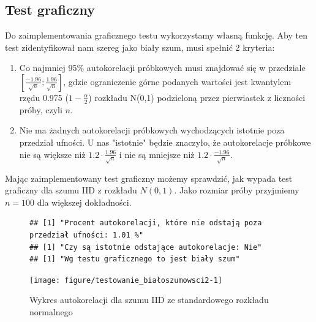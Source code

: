 \documentclass[10pt, a4paper]{article}\usepackage[]{graphicx}\usepackage[]{xcolor}
\makeatletter
\newenvironment{kframe}{%
 \def\at@end@of@kframe{}%
 \ifinner\ifhmode%
  \def\at@end@of@kframe{\end{minipage}}%
  \begin{minipage}{\columnwidth}%
 \fi\fi%
 \def\FrameCommand##1{\hskip\@totalleftmargin \hskip-\fboxsep
 \colorbox{shadecolor}{##1}\hskip-\fboxsep
     \hskip-\linewidth \hskip-\@totalleftmargin \hskip\columnwidth}%
 \MakeFramed {\advance\hsize-\width
   \@totalleftmargin\z@ \linewidth\hsize
   \@setminipage}}%
 {\par\unskip\endMakeFramed%
 \at@end@of@kframe}
\newenvironment{knitrout}{}{} %
\makeatother
\begin{document}
\subsection{Test graficzny} \label{sekcja1}
Do zaimplementowania graficznego testu wykorzystamy własną funkcję. Aby ten test zidentyfikował nam szereg jako biały szum, musi spełnić 2 kryteria:
\begin{enumerate}
\item Co najmniej 95\% autokorelacji próbkowych musi znajdować się w przedziale $[\frac{-1.96}{\sqrt{n}}; \frac{1.96}{\sqrt{n}}]$, gdzie ograniczenie górne podanych wartości jest kwantylem rzędu 0.975 ($1-\frac{\alpha}{2}$) rozkładu N(0,1) podzieloną przez pierwiastek z liczności próby, czyli $n$.
\item Nie ma żadnych autokorelacji próbkowych wychodzących istotnie poza przedział ufności. U nas "istotnie" będzie znaczyło, że autokorelacje próbkowe nie są większe niż $1.2\cdot\frac{1.96}{\sqrt{n}}$ i nie są mniejsze niż $1.2\cdot\frac{-1.96}{\sqrt{n}}$.
\end{enumerate}

Mając zaimplementowany test graficzny możemy sprawdzić, jak wypada test graficzny dla szumu IID z rozkładu $N(0,1)$. Jako rozmiar próby przyjmiemy $n=100$ dla większej dokładności.
\begin{figure}[H]
\begin{knitrout}
\color{fgcolor}\begin{kframe}
\begin{verbatim}
## [1] "Procent autokorelacji, które nie odstają poza przedział ufności: 1.01 %"
## [1] "Czy są istotnie odstające autokorelacje: Nie"
## [1] "Wg testu graficznego to jest biały szum"
\end{verbatim}
\end{kframe}

{\centering \texttt{[image: figure/testowanie\_białoszumowsci2-1]} 

}


\end{knitrout}
\caption{Wykres autokorelacji dla szumu IID ze standardowego rozkładu normalnego}
\label{graph1}
\end{figure}
\end{document}
